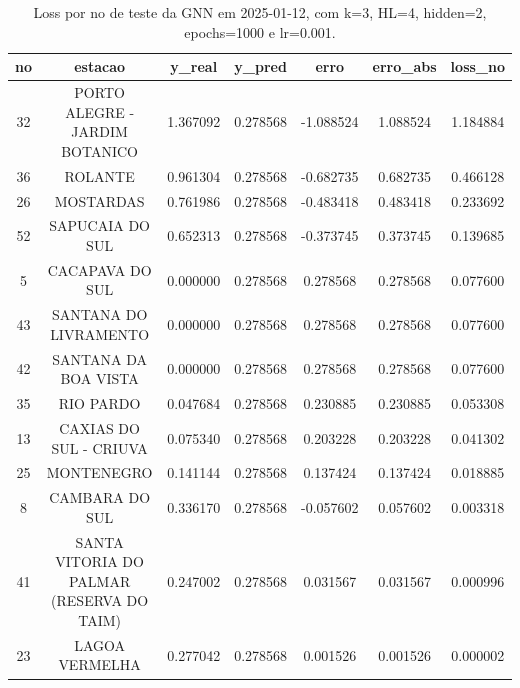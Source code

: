 \begin{table}[h]
\centering
\caption{Loss por no de teste da GNN em 2025-01-12, com k=3, HL=4, hidden=2, epochs=1000 e lr=0.001.}
\label{tab:gnn_loss_k3_hl4_h2_e1000_d20250112}
\begin{tabular}{ccccccc}
\toprule
no & estacao & y\_real & y\_pred & erro & erro\_abs & loss\_no \\
\midrule
32 & PORTO ALEGRE - JARDIM BOTANICO & 1.367092 & 0.278568 & -1.088524 & 1.088524 & 1.184884 \\
36 & ROLANTE & 0.961304 & 0.278568 & -0.682735 & 0.682735 & 0.466128 \\
26 & MOSTARDAS & 0.761986 & 0.278568 & -0.483418 & 0.483418 & 0.233692 \\
52 & SAPUCAIA DO SUL & 0.652313 & 0.278568 & -0.373745 & 0.373745 & 0.139685 \\
5 & CACAPAVA DO SUL & 0.000000 & 0.278568 & 0.278568 & 0.278568 & 0.077600 \\
43 & SANTANA DO LIVRAMENTO & 0.000000 & 0.278568 & 0.278568 & 0.278568 & 0.077600 \\
42 & SANTANA DA BOA VISTA & 0.000000 & 0.278568 & 0.278568 & 0.278568 & 0.077600 \\
35 & RIO PARDO & 0.047684 & 0.278568 & 0.230885 & 0.230885 & 0.053308 \\
13 & CAXIAS DO SUL - CRIUVA & 0.075340 & 0.278568 & 0.203228 & 0.203228 & 0.041302 \\
25 & MONTENEGRO & 0.141144 & 0.278568 & 0.137424 & 0.137424 & 0.018885 \\
8 & CAMBARA DO SUL & 0.336170 & 0.278568 & -0.057602 & 0.057602 & 0.003318 \\
41 & SANTA VITORIA DO PALMAR (RESERVA DO TAIM) & 0.247002 & 0.278568 & 0.031567 & 0.031567 & 0.000996 \\
23 & LAGOA VERMELHA & 0.277042 & 0.278568 & 0.001526 & 0.001526 & 0.000002 \\
\bottomrule
\end{tabular}
\end{table}

